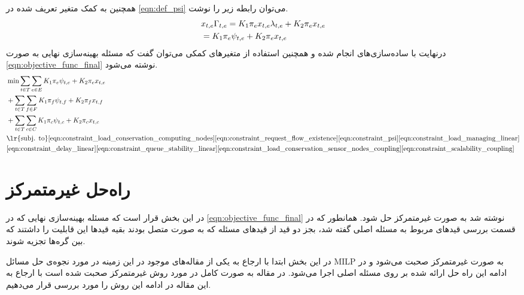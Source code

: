	همچنین به کمک متغیر تعریف شده در \cref{eqn:def_psi}	می‌توان رابطه زیر را نوشت.
	\begin{align}
		&\notag x_{t,e}\Gamma_{t,e} = K_1\pi_ex_{t,e}\lambda_{t,e} + K_2\pi_ex_{t,e} \\
		&= K_1\pi_e\psi_{t,e} + K_2\pi_ex_{t,e}
	\end{align}
	درنهایت با ساده‌سازی‌های انجام شده و همچنین استفاده از متغیرهای کمکی می‌توان گفت که مسئله بهینه‌سازی نهایی به صورت \cref{eqn:objective_func_final} نوشته می‌شود. 
	\begin{align}
		&\min \sum_{t \in T}\sum_{e \in E} K_1\pi_e\psi_{t,e}+K_2\pi_ex_{t,e}\notag \\
		&+\sum_{t \in T}\sum_{f \in F} K_1\pi_f\psi_{t,f}+K_2\pi_fx_{t,f}\notag \\
		&+\sum_{t \in T}\sum_{c \in C} K_1\pi_c\psi_{t,c}+K_2\pi_cx_{t,c} \label{eqn:objective_func_final} \notag \\
		&\text{\lr{subj. to}}
		\cref{eqn:constraint_load_conservation_computing_nodes}
		\cref{eqn:constraint_request_flow_existence}\cref{eqn:constraint_psi}
		\cref{eqn:constraint_load_managing_linear} \notag \\
		&\cref{eqn:constraint_delay_linear}
		\cref{eqn:constraint_queue_stability_linear}
		\cref{eqn:constraint_load_conservation_sensor_nodes_coupling}
		\cref{eqn:constraint_scalability_coupling}
	\end{align}
	\section{راه‌حل غیرمتمرکز}
	در این بخش قرار است که مسئله بهینه‌سازی نهایی که در \cref{eqn:objective_func_final} نوشته شد به صورت غیرمتمرکز حل شود. 
	همانطور که در قسمت بررسی قیدهای مربوط به مسئله اصلی گفته شد، بجز دو قید از قیدهای مسئله که به صورت متصل بودند بقیه قیدها این قابلیت را داشتند که بین گره‌ها تجزیه شوند. 
	
	در این بخش ابتدا با ارجاع به یکی از مقاله‌های موجود در این زمینه در مورد نجوه‌ی حل مسائل MILP به صورت غیرمتمرکز صحبت می‌شود و در ادامه این راه حل ارائه شده بر روی مسئله اصلی اجرا می‌شود. 
	در مقاله \cite{decentralized_approach} به صورت کامل در مورد روش غیرمتمرکز صحبت شده است با ارجاع به این مقاله در ادامه این روش را مورد بررسی قرار می‌دهیم. 
	
